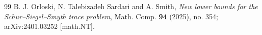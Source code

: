 \documentclass[10pt,a4paper]{amsart}
\begin{document}
\begin{thebibliography}{99}
 B. J. Orloski, N. Talebizadeh Sardari and A. Smith, \emph{New lower bounds for the Schur--Siegel--Smyth trace problem}, Math. Comp. \textbf{94} (2025), no. 354; arXiv:2401.03252 [math.NT].
\end{thebibliography}
\end{document}
